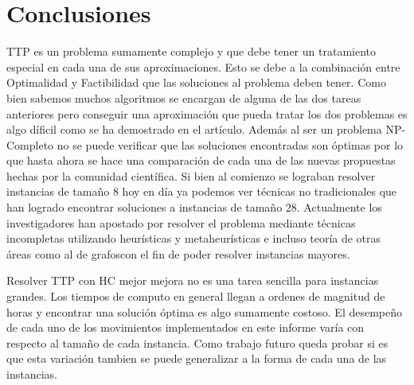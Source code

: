 \documentclass[letter, 10pt]{article}
\begin{document}
\section{Conclusiones}
    TTP es un problema sumamente complejo y que debe tener un tratamiento especial en cada una de sus aproximaciones. Esto se debe a la combinación entre Optimalidad y Factibilidad que las soluciones al problema deben tener. Como bien sabemos muchos algoritmos se encargan de alguna de las dos tareas anteriores pero conseguir una aproximación que pueda tratar los dos problemas es algo díficil como se ha demostrado en el artículo. Además al ser un problema NP-Completo no se puede verificar que las soluciones encontradas son óptimas por lo que hasta ahora se hace una comparación de cada una de las nuevas propuestas hechas por la comunidad científica. Si bien al comienzo se lograban resolver instancias de tamaño $8$ hoy en día ya podemos ver técnicas no tradicionales que han logrado encontrar soluciones a instancias de tamaño $28$.  Actualmente los investigadores han apostado por resolver el problema mediante técnicas incompletas utilizando heurísticas y metaheurísticas  e incluso teoría de otras áreas como al de grafoscon el fin de poder resolver instancias mayores. 
    
    Resolver TTP con HC mejor mejora no es una tarea sencilla para instancias grandes. Los tiempos de computo en general llegan a ordenes de magnitud de horas y encontrar una solución óptima es algo sumamente costoso. El desempeño de cada uno de los movimientos implementados en este informe varía con respecto al tamaño de cada instancia. Como trabajo futuro queda probar si es que esta variación tambien se puede generalizar a la forma de cada una de las instancias. 



\end{document}
